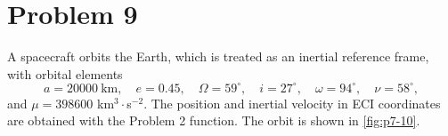 \section{Problem 9}
\label{sec:problem9}

A spacecraft orbits the Earth, which is treated as an inertial reference frame, with orbital elements
\[
a = 20000\ \text{km}, \quad e = 0.45, \quad \Omega = 59^\circ, \quad i = 27^\circ, \quad \omega = 94^\circ, \quad \nu = 58^\circ,
\]
and $\mu = 398600$ km$^3\cdot$s$^{-2}$. The position and inertial velocity in ECI coordinates are obtained with the Problem 2 function. The orbit is shown in \cref{fig:p7-10}.


\FloatBarrier
